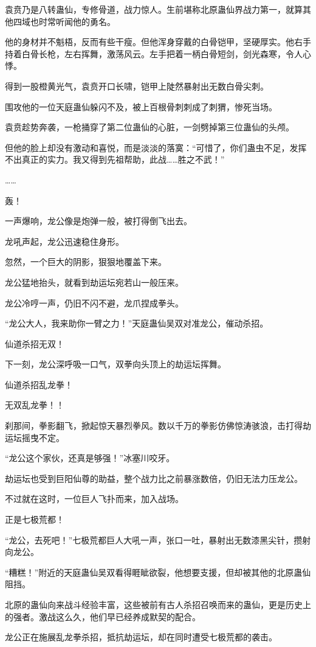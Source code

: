 \begin{this_body}
袁贲乃是八转蛊仙，专修骨道，战力惊人。生前堪称北原蛊仙界战力第一，就算其他四域也时常听闻他的勇名。

他的身材并不魁梧，反而有些干瘦。但他浑身穿戴的白骨铠甲，坚硬厚实。他右手持着白骨长枪，左右挥舞，激荡风云。左手把着一柄白骨短剑，剑光森寒，令人心悸。

得到一股橙黄光气，袁贲开口长啸，铠甲上陡然暴射出无数白骨尖刺。

围攻他的一位天庭蛊仙躲闪不及，被上百根骨刺刺成了刺猬，惨死当场。

袁贲趁势奔袭，一枪捅穿了第二位蛊仙的心脏，一剑劈掉第三位蛊仙的头颅。

但他的脸上却没有激动和喜悦，而是淡淡的落寞：“可惜了，你们蛊虫不足，发挥不出真正的实力。我又得到先祖帮助，此战……胜之不武！”

……

轰！

一声爆响，龙公像是炮弹一般，被打得倒飞出去。

龙吼声起，龙公迅速稳住身形。

忽然，一个巨大的阴影，狠狠地覆盖下来。

龙公猛地抬头，就看到劫运坛宛若山一般压来。

龙公冷哼一声，仍旧不闪不避，龙爪捏成拳头。

“龙公大人，我来助你一臂之力！”天庭蛊仙吴双对准龙公，催动杀招。

仙道杀招无双！

下一刻，龙公深呼吸一口气，双拳向头顶上的劫运坛挥舞。

仙道杀招乱龙拳！

无双乱龙拳！！

刹那间，拳影翻飞，掀起惊天暴烈拳风。数以千万的拳影仿佛惊涛骇浪，击打得劫运坛摇曳不定。

“龙公这个家伙，还真是够强！”冰塞川咬牙。

劫运坛也受到巨阳仙尊的助益，整个战力比之前暴涨数倍，仍旧无法力压龙公。

不过就在这时，一位巨人飞扑而来，加入战场。

正是七极荒都！

“龙公，去死吧！”七极荒都巨人大吼一声，张口一吐，暴射出无数漆黑尖针，攒射向龙公。

“糟糕！”附近的天庭蛊仙吴双看得睚眦欲裂，他想要支援，但却被其他的北原蛊仙阻挡。

北原的蛊仙向来战斗经验丰富，这些被前有古人杀招召唤而来的蛊仙，更是历史上的强者。激战这么久，他们早已经养成默契的配合。

龙公正在施展乱龙拳杀招，抵抗劫运坛，却在同时遭受七极荒都的袭击。


\end{this_body}
